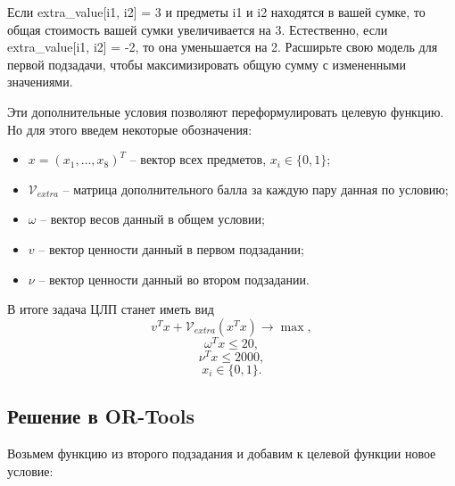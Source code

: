 \documentclass[11pt]{article}
\begin{document}
    Если extra\_value{[}i1, i2{]} = 3 и предметы i1 и i2 находятся в вашей
сумке, то общая стоимость вашей сумки увеличивается на 3. Естественно,
если extra\_value{[}i1, i2{]} = -2, то она уменьшается на 2. Расширьте
свою модель для первой подзадачи, чтобы максимизировать общую сумму с
измененными значениями.

    Эти дополнительные условия позволяют переформулировать целевую функцию.
Но для этого введем некоторые обозначения:

\begin{itemize}
\item
  \(x = (x_1,\ldots, x_8)^T\) -- вектор всех предметов,
  \(x_i \in \{0, 1\}\);
\item
  \(\mathcal V_{extra}\) -- матрица дополнительного балла за каждую пару
  данная по условию;
\item
  \(\omega\) -- вектор весов данный в общем условии;
\item
  \(v\) -- вектор ценности данный в первом подзадании;
\item
  \(\nu \) -- вектор ценности данный во втором подзадании.
\end{itemize}

В итоге задача ЦЛП станет иметь вид
\[v^T x + \mathcal V_{extra} (x^Tx) \to \max,\] \[\omega^T x \leq 20,\]
\[\nu  ^T x \leq 2000,\] \[x_i \in \{0,1\}.\]

    \subsection{Решение в
OR-Tools}\label{ux440ux435ux448ux435ux43dux438ux435-ux432-or-tools}

    Возьмем функцию из второго подзадания и добавим к целевой функции новое
условие:
\end{document}
